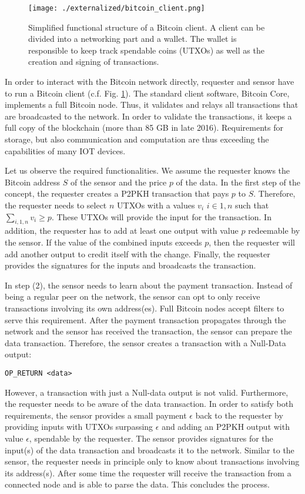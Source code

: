 \begin{figure}
\centering
\texttt{[image: ./externalized/bitcoin\_client.png]}
\caption{Simplified functional structure of a Bitcoin client. A client can be divided into a networking part and a wallet. The wallet is responsible to keep track spendable coins (\ac{UTXO}s) as well as the creation and signing of transactions.}
\label{fig:btcClient}
\end{figure}


In order to interact with the Bitcoin network directly, requester and sensor have to run a Bitcoin client (c.f. Fig. \ref{fig:btcClient}). The standard client software, Bitcoin Core, implements a full Bitcoin node. Thus, it validates and relays all transactions that are broadcasted to the network. In order to validate the transactions, it keeps a full copy of the blockchain (more than 85 GB in late 2016). Requirements for storage, but also communication and computation are thus exceeding the capabilities of many \ac{IOT} devices.

Let us observe the required functionalities. We assume the requester knows the Bitcoin address $S$ of the sensor and the price $p$ of the data. In the first step of the concept, the requester creates a \ac{P2PKH} transaction that pays $p$ to $S$. Therefore, the requester needs to select $n$ \ac{UTXO}s with a values $v_i$ $i \in {1,n}$ such that $\sum_{i,1,n}v_i\ge p$. These \ac{UTXO}s will provide the input for the transaction. In addition, the requester has to add at least one output with value $p$ redeemable by the sensor. If the value of the combined inputs exceeds $p$, then the requester will add another output to credit itself with the change. Finally, the requester provides the signatures for the inputs and broadcasts the transaction.

In step (2), the sensor needs to learn about the payment transaction. Instead of being a regular peer on the network, the sensor can opt to only receive transactions involving its own address(es). Full Bitcoin nodes accept filters to serve this requirement. After the payment transaction propagates through the network and the sensor has received the transaction, the sensor can prepare the data transaction. Therefore, the sensor creates a transaction with a Null-Data output:

\begin{lstlisting}
OP_RETURN <data>
\end{lstlisting}

However, a transaction with just a Null-data output is not valid. Furthermore, the requester needs to be aware of the data transaction. In order to satisfy both requirements, the sensor provides a small payment $\epsilon$ back to the requester by providing inputs with \ac{UTXO}s surpassing $\epsilon$ and adding an \ac{P2PKH} output with value $\epsilon$, spendable by the requester. The sensor provides signatures for the input(s) of the data transaction and broadcasts it to the network. Similar to the sensor, the requester needs in principle only to know about transactions involving its address(s). After some time the requester will receive the transaction from a connected node and is able to parse the data. This concludes the process. 

